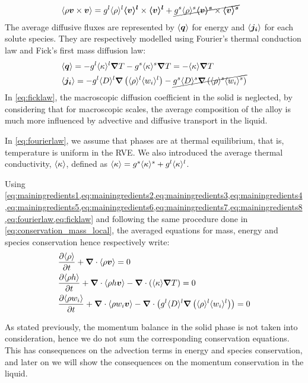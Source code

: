 \begin{align}
\label{eq:mainingredients8}
& \langle \rho \boldsymbol{v} \times \boldsymbol{v} \rangle = {g^l} \langle \rho \rangle^l \boldsymbol{\langle v \rangle^l} \times \boldsymbol{\langle v \rangle^l} + \cancel{{g^s} \langle \rho \rangle^s \boldsymbol{\langle v \rangle^s} \times \boldsymbol{\langle v \rangle^s}}
\end{align}
The average diffusive fluxes are represented by $\langle \boldsymbol{q} \rangle$ for energy and $\langle \boldsymbol{j_i} \rangle$ for each solute species.
They are respectively modelled using Fourier's thermal conduction law and Fick's first mass diffusion law:
\begin{align}
\label{eq:fourierlaw}
& \langle \boldsymbol{q} \rangle = - {g^l} \langle \kappa \rangle^l \boldsymbol{\nabla} T -  {g^s} \langle \kappa \rangle^s \boldsymbol{\nabla} T = -\langle \kappa \rangle \boldsymbol{\nabla} T \\
\label{eq:ficklaw}
& \langle \boldsymbol{j_i} \rangle = - {g^l} \langle D \rangle^l \boldsymbol{\nabla} \left( \langle \rho \rangle^l \langle w_i \rangle^l \right) - \cancel{{g^s} \langle D \rangle^s \boldsymbol{\nabla} \left( \langle \rho \rangle^s \langle w_i \rangle^s \right)}
\end{align}
In \cref{eq:ficklaw}, the macroscopic diffusion coefficient in the solid is neglected, 
by considering that for macroscopic scales, the average composition of the alloy is much more influenced by advective 
and diffusive transport in the liquid.

In \cref{eq:fourierlaw}, we assume that phases are at thermal equilibrium, that is, temperature is uniform in the RVE.
We also introduced the average thermal conductivity, $\langle \kappa \rangle$, defined as $\langle \kappa \rangle={g^s} \langle \kappa \rangle^s + {g^l} \langle \kappa \rangle^l$.

Using \cref{eq:mainingredients1,eq:mainingredients2,eq:mainingredients3,eq:mainingredients4,eq:mainingredients5,eq:mainingredients6,eq:mainingredients7,eq:mainingredients8,eq:fourierlaw,eq:ficklaw}
and following the same procedure done in \cref{eq:conservation_mass_local}, the averaged equations for mass, energy and species conservation hence respectively write:
\begin{align}
\label{eq:conservation_mass}
& \frac{\partial \langle \rho \rangle}{\partial t} + \boldsymbol{\nabla} \cdot \langle \rho \boldsymbol{v} \rangle = 0 \\
\label{eq:conservation_energy_init}
& \frac{\partial \langle \rho h \rangle}{\partial t} + \boldsymbol{\nabla} \cdot \langle \rho h \boldsymbol{v} \rangle - \boldsymbol{\nabla} \cdot \left( \langle \kappa \rangle \boldsymbol{\nabla} T \right) = 0 \\
\label{eq:conservation_solute_init}
& \frac{\partial \langle \rho w_i \rangle}{\partial t} + \boldsymbol{\nabla} \cdot \langle \rho w_i \boldsymbol{v} \rangle - \boldsymbol{\nabla} \cdot \left( {g^l} \langle D \rangle^l \boldsymbol{\nabla} \left( \langle \rho \rangle^l \langle w_i \rangle^l \right) \right)= 0
\end{align}

As stated previously, the momentum balance in the solid phase is not taken into consideration, hence we do not sum the corresponding
conservation equations. This has consequences on the advection terms in energy and species conservation, and later on we will show
the consequences on the momentum conservation in the liquid. 

